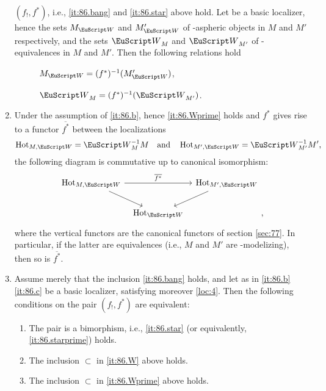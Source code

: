 \begin{scholie}
\begin{enumerate}[label=\alph*),font=\normalfont]
    $(f_!,f^*)$, i.e., \textup{\ref{it:86.bang}} and
    \textup{\ref{it:86.star}} above hold. Let \scrW{} be a basic
    localizer, hence the sets $M_\scrW$ and $M'_\scrW$ of
    \scrW-aspheric objects in $M$ and $M'$ respectively, and the sets
    $\scrW_M$ and $\scrW_{M'}$ of \scrW-equivalences in $M$ and
    $M'$. Then the following relations hold
    \begin{description}
    \item[] $M_\scrW =
      (f^*)^{-1}(M'_\scrW)$,
    \item[] $\scrW_M =
      (f^*)^{-1}(\scrW_{M'})$.      
    \end{description}
  \item\label{it:86.c}
    Under the assumption of \textup{\ref{it:86.b}}, hence
    \textup{\ref{it:86.Wprime}} holds and $f^*$ gives rise to a
    functor $\overline{f^*}$ between the localizations
    \[\HotOf_{M,\scrW} = \scrW_M^{-1}M \quad\text{and}\quad
    \HotOf_{M',\scrW}=\scrW_{M'}^{-1}M',\]
    the following diagram is commutative up to canonical isomorphism:
    \[\begin{tikzcd}[baseline=(O.base),column sep=tiny]
      \HotOf_{M,\scrW}\ar[rr,"\overline{f^*}"]
      \ar[dr] & & \HotOf_{M',\scrW}\ar[dl] \\
      & |[alias=O]| \HotOf_\scrW &
    \end{tikzcd},\]
    where the vertical functors are the canonical functors of section
    \ref{sec:77}. In particular, if the latter are equivalences
    \textup(i.e., $M$ and $M'$ are \scrW-modelizing\textup), then so
    is $\overline{f^*}$.
  \item\label{it:86.d}
    Assume merely that the inclusion \textup{\ref{it:86.bang}} holds,
    and let \scrW{} as in \textup{\ref{it:86.b}}\textup{\ref{it:86.c}}
    be a basic localizer, satisfying moreover
    \textup{\ref{loc:4}}. Then the following conditions on the pair
    $(f_!,f^*)$ are equivalent:
    \begin{enumerate}[label=(\roman*),font=\normalfont]
    \item\label{it:86.d.i}
      The pair is a bimorphism, i.e., \textup{\ref{it:86.star}}
      \textup(or equivalently, \textup{\ref{it:86.starprime})} holds.
    \item\label{it:86.d.ii}
      The inclusion $\subset$ in \textup{\ref{it:86.W}} above holds.
    \item\label{it:86.d.iii}
      The inclusion $\subset$ in \textup{\ref{it:86.Wprime}} above holds.

\end{enumerate}
\end{enumerate}
\end{scholie}
